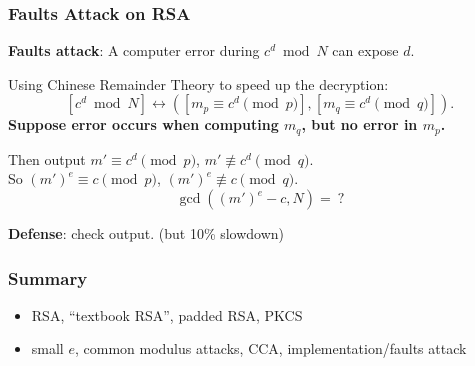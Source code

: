 \begin{frame}\frametitle{Faults Attack on RSA}
\textbf{Faults attack}:
A computer error during $c^d\bmod N$ can expose $d$.\newline

Using Chinese Remainder Theory to speed up the decryption:
\[ [c^d \bmod N] \leftrightarrow ([m_p \equiv c^d \pmod p],[m_q \equiv c^d \pmod q]).\]
\textbf{Suppose error occurs when computing $m_q$, but no error in $m_p$.}\newline

Then output $m' \equiv c^d \pmod p$, $m' \not \equiv c^d \pmod q$.\\
So $(m')^e \equiv c \pmod p$, $(m')^e \not \equiv c \pmod q$.\\
\alert{\[\gcd((m')^e-c, N)=\ ?\]}

\textbf{Defense}: check output. (but 10\% slowdown)
\end{frame}
\begin{frame}\frametitle{Summary}
\begin{itemize}
\item RSA, ``textbook RSA'', padded RSA, PKCS
\item small $e$, common modulus attacks, CCA, implementation/faults attack
\end{itemize}
\end{frame}

